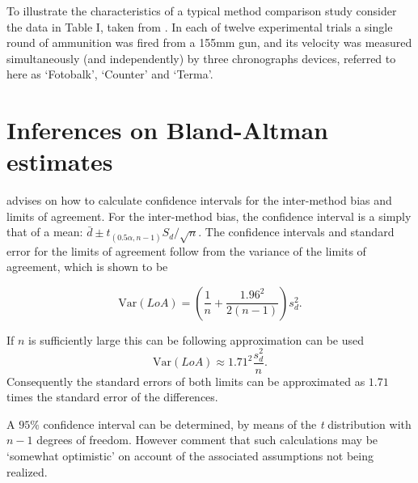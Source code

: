 \documentclass[12pt, a4paper]{report}
\theoremstyle{plain}
\theoremstyle{definition}
\theoremstyle{remark}
\begin{document}
	To illustrate the characteristics of a typical method comparison
	study consider the data in Table I, taken from \citet{Grubbs73}.
	In each of twelve experimental trials a single round of ammunition
	was fired from a 155mm gun, and its velocity was measured
	simultaneously (and independently) by three chronographs devices,
	referred to here as `Fotobalk', `Counter' and `Terma'.
	\smallskip
	
		\section{Inferences on Bland-Altman estimates}
	\citet*{BA99}advises on how to calculate confidence intervals for the inter-method bias and limits of agreement.
	For the inter-method bias, the confidence interval is a simply that of a mean: $\bar{d} \pm t_{(0.5\alpha,n-1)} S_{d}/\sqrt{n}$.
	The confidence
	intervals and standard error for the limits of agreement follow from the variance of the limits of agreement, which is shown to be
	
	\[
	\mbox{Var}(LoA) = (\frac{1}{n}+\frac{1.96^{2}}{2(n-1)})s_{d}^{2}.
	\]
	
	If $n$ is sufficiently large this can be following approximation
	can be used
	\[
	\mbox{Var}(LoA) \approx 1.71^{2}\frac{s_{d}^{2}}{n}.
	\]
	Consequently the standard errors of both limits can be
	approximated as $1.71$ times the standard error of the
	differences.
	
	A $95\%$ confidence interval can be determined, by means of the
	\emph{t} distribution with $n-1$ degrees of freedom. However \citet*{BA99} comment that such calculations  may be `somewhat optimistic' on account of the associated assumptions not being realized.
	
	
\end{document}
